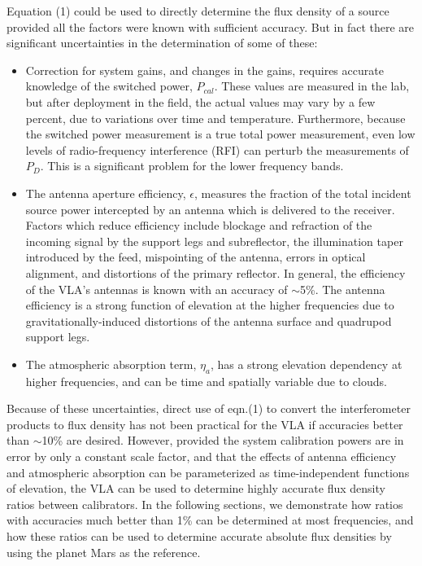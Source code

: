 \documentclass{aastex}
\begin{document}
Equation (1) could be used to directly determine the flux density of a
source provided all the factors were known with sufficient accuracy.
But in fact there are significant uncertainties in the determination
of some of these:
\begin{itemize}
\item Correction for system gains, and changes in the gains, requires
  accurate knowledge of the switched power, $P_{cal}$.  These values
  are measured in the lab, but after deployment in the field, the
  actual values may vary by a few percent, due to variations over time
  and temperature. Furthermore, because the switched power measurement
  is a true total power measurement, even low levels of
  radio-frequency interference (RFI) can perturb the measurements of
  $P_D$.  This is a significant problem for the lower frequency bands.
\item The antenna aperture efficiency, $\epsilon$, measures the
  fraction of the total incident source power intercepted by an
  antenna which is delivered to the receiver.  Factors which reduce
  efficiency include blockage and refraction of the incoming signal by
  the support legs and subreflector, the illumination taper introduced
  by the feed, mispointing of the antenna, errors in optical
  alignment, and distortions of the primary reflector. In general, the
  efficiency of the VLA's antennas is known with an accuracy of
  $\sim$5\%.  The antenna efficiency is a strong function of elevation
  at the higher frequencies due to gravitationally-induced distortions
  of the antenna surface and quadrupod support legs.
\item The atmospheric absorption term, $\eta_a$, has a strong
  elevation dependency at higher frequencies, and can be time and
  spatially variable due to clouds.
\end{itemize}

Because of these uncertainties, direct use of eqn.(1) to convert the
interferometer products to flux density has not been practical for the
VLA if accuracies better than $\sim$10\% are desired.  However,
provided the system calibration powers are in error by only a constant
scale factor, and that the effects of antenna efficiency and
atmospheric absorption can be parameterized as time-independent
functions of elevation, the VLA can be used to determine highly
accurate flux density ratios between calibrators.  In the following
sections, we demonstrate how ratios with accuracies much better than
1\% can be determined at most frequencies, and how these ratios can be
used to determine accurate absolute flux densities by using the planet
Mars as the reference.
\end{document}
